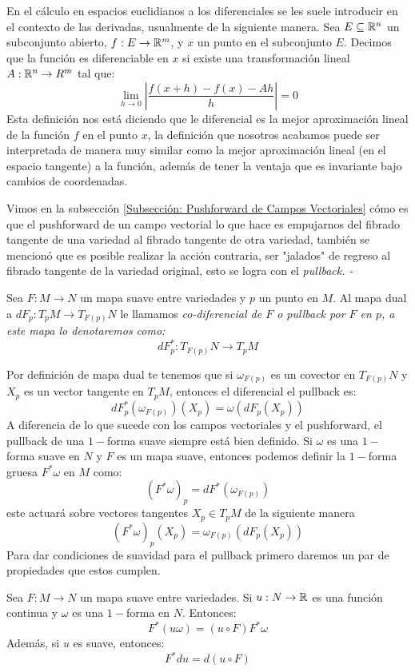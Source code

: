En el cálculo en espacios euclidianos a los diferenciales se les suele introducir en el contexto de las derivadas, usualmente de la siguiente manera. Sea $E \subseteq \mathbb{R}^n$ un subconjunto abierto, $f: E \to \mathbb{R}^m$, y $x$ un punto en el subconjunto $E$. Decimos que la función es diferenciable en $x$ si existe una transformación lineal $A: \mathbb{R}^n \to R^m$ tal que:
\[
	\lim_{h \to 0} \left| \frac{f(x+h) - f(x) - Ah}{h} \right| = 0
\]
Esta definición nos está diciendo que le diferencial es la mejor aproximación lineal de la función $f$ en el punto $x$, la definición que nosotros acabamos puede ser interpretada de manera muy similar como la mejor aproximación lineal (en el espacio tangente) a la función, además de tener la ventaja que es invariante bajo cambios de coordenadas.

Vimos en la subsección \ref{Subsección: Pushforward de Campos Vectoriales} cómo es que el pushforward de un campo vectorial lo que hace es empujarnos del fibrado tangente de una variedad al fibrado tangente de otra variedad, también se mencionó que es posible realizar la acción contraria, ser "jalados" de regreso al fibrado tangente de la variedad original, esto se logra con el \it{pullback}.
-
\begin{definition}[Pullback]
	Sea $F: M \to N$ un mapa suave entre variedades y $p$ un punto en $M$. Al mapa dual a $dF_p: T_pM \to T_{F(p)}N$ le llamamos \it{co-diferencial de $F$} o \it{pullback por $F$ en $p$}, a este mapa lo denotaremos como:
	\[
		dF_p^*: T_{F(p)}N \to T_pM
	\]
\end{definition}

Por definición de mapa dual te tenemos que si $\omega_{F(p)}$ es un covector en $T_{F(p)}N$ y $X_p$ es un vector tangente en $T_pM$, entonces el diferencial el pullback es:
\[
	dF_{p}^{*}(\omega_{F(p)})(X_p) = \omega(dF_p(X_p))
\]
A diferencia de lo que sucede con los campos vectoriales y el pushforward, el pullback de una  $1-$forma suave siempre está bien definido. Si $\omega$ es una $1-$forma suave en $N$ y $F$ es un mapa suave, entonces podemos definir la $1-$forma gruesa $F^* \omega$ en $M$ como:
\[
	(F^*\omega)_p = dF^* (\omega_{F(p)})
\]
este actuará sobre vectores tangentes $X_p \in T_pM$ de la siguiente manera
\[
	(F^*\omega)_p(X_p) = \omega_{F(p)}(dF_p(X_p))
\]
Para dar condiciones de suavidad para el pullback primero daremos un par de propiedades que estos cumplen.
\begin{lemma}
	Sea $F: M \to N$ un mapa suave entre variedades. Si $u: N \to \mathbb{R}$ es una función continua y $\omega$ es una $1-$forma en $N$. Entonces:
	\[
		F^{*}(u \omega) = (u \circ F) F^*\omega
	\]
	Además, si $u$ es suave, entonces:
	\[
		F^* du = d(u \circ F)
	\]
\end{lemma}

